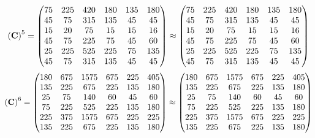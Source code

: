 \documentclass[10pt,a4paper]{article}
\begin{document}
	\[
		\left(\bold{C}\right)^{5} = 
		\begin{pmatrix}
			{{75}} {} & {{225}} {} & {{420}} {} & {{180}} {} & {{135}} {} & {{180}} {} \\
			{{45}} {} & {{75}} {} & {{315}} {} & {{135}} {} & {{45}} {} & {{45}} {} \\
			{{15}} {} & {{20}} {} & {{75}} {} & {{15}} {} & {{15}} {} & {{16}} {} \\
			{{45}} {} & {{75}} {} & {{225}} {} & {{75}} {} & {{45}} {} & {{60}} {} \\
			{{25}} {} & {{225}} {} & {{525}} {} & {{225}} {} & {{75}} {} & {{135}} {} \\
			{{45}} {} & {{75}} {} & {{315}} {} & {{135}} {} & {{45}} {} & {{45}} {} \\
		\end{pmatrix}
		\approx
		\begin{pmatrix}
			75       & 225      & 420      & 180      & 135      & 180      \\
			45       & 75       & 315      & 135      & 45       & 45       \\
			15       & 20       & 75       & 15       & 15       & 16       \\
			45       & 75       & 225      & 75       & 45       & 60       \\
			25       & 225      & 525      & 225      & 75       & 135      \\
			45       & 75       & 315      & 135      & 45       & 45       \\
		\end{pmatrix}
	\]
	\[
		\left(\bold{C}\right)^{6} = 
		\begin{pmatrix}
			{{180}} {} & {{675}} {} & {{1575}} {} & {{675}} {} & {{225}} {} & {{405}} {} \\
			{{135}} {} & {{225}} {} & {{675}} {} & {{225}} {} & {{135}} {} & {{180}} {} \\
			{{25}} {} & {{75}} {} & {{140}} {} & {{60}} {} & {{45}} {} & {{60}} {} \\
			{{75}} {} & {{225}} {} & {{525}} {} & {{225}} {} & {{135}} {} & {{180}} {} \\
			{{225}} {} & {{375}} {} & {{1575}} {} & {{675}} {} & {{225}} {} & {{225}} {} \\
			{{135}} {} & {{225}} {} & {{675}} {} & {{225}} {} & {{135}} {} & {{180}} {} \\
		\end{pmatrix}
		\approx
		\begin{pmatrix}
			180      & 675      & 1575     & 675      & 225      & 405      \\
			135      & 225      & 675      & 225      & 135      & 180      \\
			25       & 75       & 140      & 60       & 45       & 60       \\
			75       & 225      & 525      & 225      & 135      & 180      \\
			225      & 375      & 1575     & 675      & 225      & 225      \\
			135      & 225      & 675      & 225      & 135      & 180      \\
		\end{pmatrix}
	\]
\end{document}
